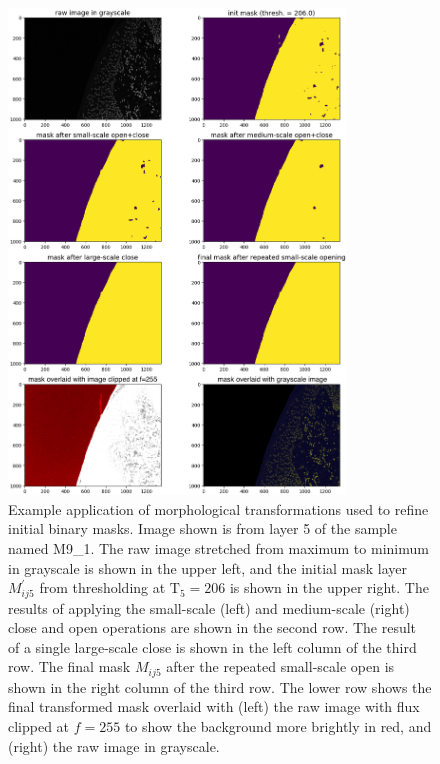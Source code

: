\documentclass[letterpaper,11pt]{article}
\newcommand{\Tau}{\mathrm{T}}
\begin{document}
\begin{figure}[!ht]
\centering
\includegraphics[width=0.80\textwidth]{images/masking/image_9941_layer_5_masks}
\caption{\footnotesize Example application of morphological transformations used to refine initial binary masks. Image shown is from layer 5 of the sample named M9\_1. The raw image stretched from maximum to minimum in grayscale is shown in the upper left, and the initial mask layer $M^{\prime}_{ij5}$ from thresholding at $\Tau_{5}=206$ is shown in the upper right. The results of applying the small-scale (left) and medium-scale (right) close and open operations are shown in the second row. The result of a single large-scale close is shown in the left column of the third row. The final mask $M_{ij5}$ after the repeated small-scale open is shown in the right column of the third row. The lower row shows the final transformed mask overlaid with (left) the raw image with flux clipped at $f=255$ to show the background more brightly in red, and (right) the raw image in grayscale.}
\label{fig:mask_example_max}
\end{figure}

\clearpage

\end{document}
